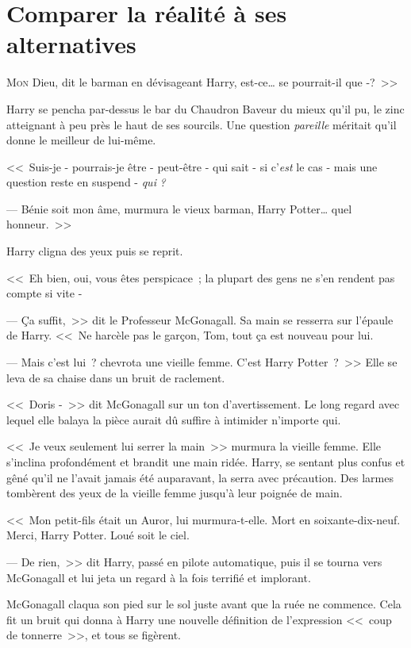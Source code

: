 \chapter{Comparer la réalité à ses alternatives}

\lettrine[ante=<<~]{M}{on} Dieu, dit le barman en dévisageant Harry, est-ce\ldots{} se pourrait-il que -?~>>

Harry se pencha par-dessus le bar du Chaudron Baveur du mieux qu'il pu, le zinc atteignant à peu près le haut de ses sourcils. Une question \emph{pareille} méritait qu'il donne le meilleur de lui-même.

<<~Suis-je - pourrais-je être - peut-être - qui sait - si c'\emph{est} le cas - mais une question reste en suspend - \emph{qui} \emph{?}

--- Bénie soit mon âme, murmura le vieux barman, Harry Potter\ldots{} quel honneur.~>>

Harry cligna des yeux puis se reprit.

<<~Eh bien, oui, vous êtes perspicace~; la plupart des gens ne s'en rendent pas compte si vite -

--- Ça suffit,~>> dit le Professeur McGonagall. Sa main se resserra sur l'épaule de Harry. <<~Ne harcèle pas le garçon, Tom, tout ça est nouveau pour lui.

--- Mais c'est lui~? chevrota une vieille femme. C'est Harry Potter~?~>> Elle se leva de sa chaise dans un bruit de raclement.

<<~Doris -~>> dit McGonagall sur un ton d'avertissement. Le long regard avec lequel elle balaya la pièce aurait dû suffire à intimider n'importe qui.

<<~Je veux seulement lui serrer la main~>> murmura la vieille femme. Elle s'inclina profondément et brandit une main ridée. Harry, se sentant plus confus et gêné qu'il ne l'avait jamais été auparavant, la serra avec précaution. Des larmes tombèrent des yeux de la vieille femme jusqu'à leur poignée de main.

<<~Mon petit-fils était un Auror, lui murmura-t-elle. Mort en soixante-dix-neuf. Merci, Harry Potter. Loué soit le ciel.

--- De rien,~>> dit Harry, passé en pilote automatique, puis il se tourna vers McGonagall et lui jeta un regard à la fois terrifié et implorant.

McGonagall claqua son pied sur le sol juste avant que la ruée ne commence. Cela fit un bruit qui donna à Harry une nouvelle définition de l'expression <<~coup de tonnerre~>>, et tous se figèrent.

